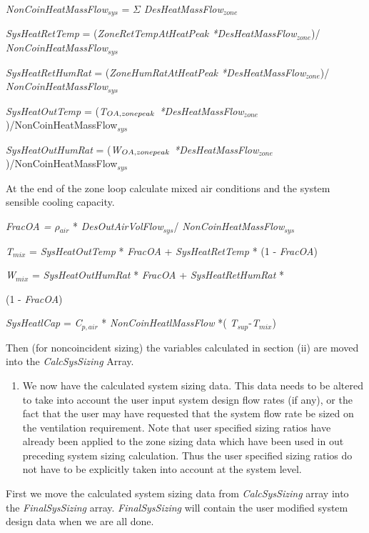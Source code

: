 \emph{NonCoinHeatMassFlow\(_{sys}\)} = $\Sigma$ \emph{DesHeatMassFlow\(_{zone}\)}

\emph{SysHeatRetTemp} = (\emph{ZoneRetTempAtHeatPeak *}\emph{DesHeatMassFlow\(_{zone}\)})/
\emph{NonCoinHeatMassFlow\(_{sys}\)}

\emph{SysHeatRetHumRat} = (\emph{ZoneHumRatAtHeatPeak *}\emph{DesHeatMassFlow\(_{zone}\)})/
\emph{NonCoinHeatMassFlow\(_{sys}\)}

\emph{SysHeatOutTemp} = (\emph{T\(_{OA,zone\\ peak}\) *DesHeatMassFlow\(_{zone}\)})/NonCoinHeatMassFlow\(_{sys}\)

\emph{SysHeatOutHumRat} = (\emph{W\(_{OA,zone\\ peak}\) *DesHeatMassFlow\(_{zone}\)})/NonCoinHeatMassFlow\(_{sys}\)

At the end of the zone loop calculate mixed air conditions and the system sensible cooling capacity.

\emph{FracOA = $\rho$\(_{air}\)} * \emph{DesOutAirVolFlow\(_{sys}\)}/ \emph{NonCoinHeatMassFlow\(_{sys}\)}

\emph{T\(_{mix}\)} = \emph{SysHeatOutTemp} * \emph{FracOA} + \emph{SysHeatRetTemp} * (1 - \emph{FracOA})

\emph{W\(_{mix}\)} = \emph{SysHeatOutHumRat} * \emph{FracOA} + \emph{SysHeatRetHumRat} *

(1 - \emph{FracOA})

\emph{SysHeatlCap} = \emph{C\(_{p,air}\)} * \emph{NonCoinHeatlMassFlow} *( \emph{T\(_{sup}\)}-\emph{T\(_{mix}\)})

Then (for noncoincident sizing) the variables calculated in section (ii) are moved into the \emph{CalcSysSizing} Array.

\begin{enumerate}
\def\labelenumi{(\arabic{enumi})}
\setcounter{enumi}{1}
\tightlist
\item
  We now have the calculated system sizing data. This data needs to be altered to take into account the user input system design flow rates (if any), or the fact that the user may have requested that the system flow rate be sized on the ventilation requirement. Note that user specified sizing ratios have already been applied to the zone sizing data which have been used in out preceding system sizing calculation. Thus the user specified sizing ratios do not have to be explicitly taken into account at the system level.
\end{enumerate}

First we move the calculated system sizing data from \emph{CalcSysSizing} array into the \emph{FinalSysSizing} array. \emph{FinalSysSizing} will contain the user modified system design data when we are all done.

